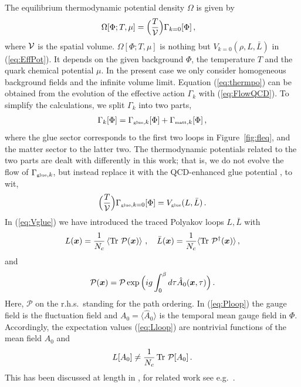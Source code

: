 \documentclass[%
reprint,
superscriptaddress,
showpacs,preprintnumbers,
 amsmath,amssymb,
 aps,
prd,
]{revtex4-1}
\newcommand{\Tr}{\ensuremath{\operatorname{Tr}}}
\def\Fig#1{Figure~\ref{#1}}
\def\Eq#1{Equation (\ref{#1})}
\def\eq#1{(\ref{#1})}
\begin{document}
The equilibrium thermodynamic potential density $\Omega$ is given by
\begin{align}
  \Omega[\Phi;T,\mu]&=\Big(\frac{T}{\cal V}\Big)
                      \Gamma_{k=0}[\Phi]\,,\label{eq:thermpo}
\end{align}
%
where $\cal V$ is the spatial volume. $\Omega[\Phi;T,\mu]$ is nothing
but $V_{k=0}(\rho, L,\bar L)$ in \eq{eq:EffPot}. It depends on the
given background $\Phi$, the temperature $T$ and the quark chemical
potential $\mu$. In the present case we only consider homogeneous
background fields and the infinite volume limit. \Eq{eq:thermpo} can
be obtained from the evolution of the effective action $\Gamma_{k}$
with \eq{eq:FlowQCD}. To simplify the calculations, we split
$\Gamma_{k}$ into two parts,
%
\begin{align}
  \Gamma_k[\Phi]=\Gamma_{\text{\tiny{glue}},k}[\Phi]+
  \Gamma_{\text{\tiny{matt}},k}[\Phi]\,,\label{eq:Gasplit}
\end{align}
%
where the glue sector corresponds to the first two loops in
\Fig{fig:fleq}, and the matter sector to the latter two. The
thermodynamic potentials related to the two parts are dealt with
differently in this work; that is, we do not evolve the flow of
$\Gamma_{\text{\tiny{glue}},k}$, but instead replace it with the
QCD-enhanced glue potential \cite{Haas:2013qwp,Herbst:2013ufa}, to
wit,
%
 \begin{align}
   \Big(\frac{T}{\cal V}\Big)\Gamma_{\text{\tiny{glue}},k=0}[\Phi]  = 
   V_{\text{\tiny{glue}}}(L, \bar L)\,. \label{eq:Vglue}
\end{align}
%
In \eq{eq:Vglue} we have introduced the traced Polyakov loops
$L,\bar L$ with
%
\begin{align}
  L(\bm{x})=\frac{1}{N_c} \left\langle \Tr\, {\cal P}(\bm x)\right\rangle
  \,,\quad  \bar L (\bm{x})=\frac{1}{N_c} \langle
  \Tr\,{\cal P}^{\dagger}(\bm x)\rangle \,,\label{eq:Lloop}
\end{align}
%
and 
%
\begin{align}
  {\cal P}(\bm x)= \mathcal{P}\exp\Big(ig\int_0^{\beta}
  d\tau \hat A_0(\bm{x},\tau)\Big)\,. \label{eq:Ploop}
\end{align}
%
Here, $\mathcal{P}$ on the r.h.s.\ standing for the path ordering.  In
\eq{eq:Ploop} the gauge field is the fluctuation field and
$A_0=\langle \hat A_0 \rangle$ is the temporal mean gauge field in
$\Phi$.  Accordingly, the expectation values \eq{eq:Lloop} are
nontrivial functions of the mean field $ A_0$ and
%
\begin{align}\label{eq:diffL}
  L[A_0] \neq \frac{1}{N_c}  \Tr\, {\cal P}[A_0]\,.
\end{align}
%
This has been discussed at length in \cite{Braun:2007bx,
  Marhauser:2008fz, Braun:2010cy, Fister:2013bh, Herbst:2015ona}, for
related work see e.g.\ \cite{Fukushima:2017csk, Fukushima:2012qa,
  Reinosa:2014ooa, Reinosa:2014zta, Maelger:2017amh, Maelger:2018vow}.
\end{document}
